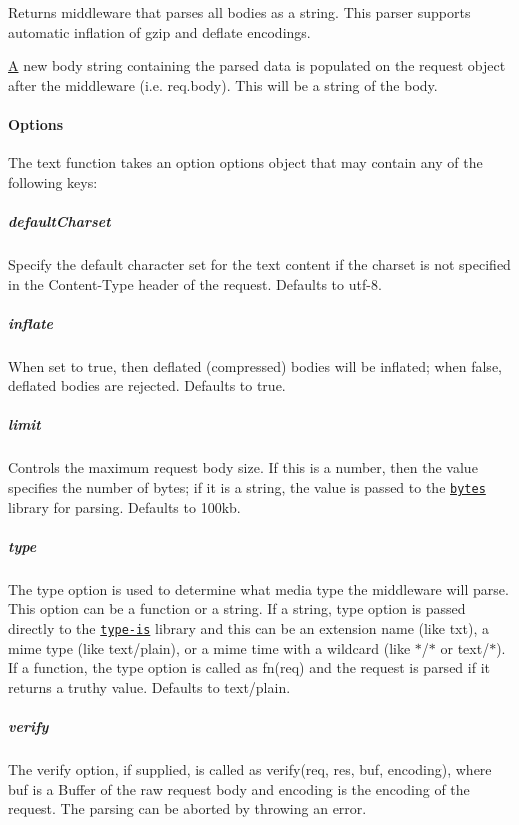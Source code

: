 Returns middleware that parses all bodies as a string. This parser supports automatic inflation of {\ttfamily gzip} and {\ttfamily deflate} encodings.

\hyperlink{class_a}{A} new {\ttfamily body} string containing the parsed data is populated on the {\ttfamily request} object after the middleware (i.\+e. {\ttfamily req.\+body}). This will be a string of the body.

\paragraph*{Options}

The {\ttfamily text} function takes an option {\ttfamily options} object that may contain any of the following keys\+:

\subparagraph*{default\+Charset}

Specify the default character set for the text content if the charset is not specified in the {\ttfamily Content-\/\+Type} header of the request. Defaults to {\ttfamily utf-\/8}.

\subparagraph*{inflate}

When set to {\ttfamily true}, then deflated (compressed) bodies will be inflated; when {\ttfamily false}, deflated bodies are rejected. Defaults to {\ttfamily true}.

\subparagraph*{limit}

Controls the maximum request body size. If this is a number, then the value specifies the number of bytes; if it is a string, the value is passed to the \href{https://www.npmjs.com/package/bytes}{\tt bytes} library for parsing. Defaults to {\ttfamily \textquotesingle{}100kb\textquotesingle{}}.

\subparagraph*{type}

The {\ttfamily type} option is used to determine what media type the middleware will parse. This option can be a function or a string. If a string, {\ttfamily type} option is passed directly to the \href{https://www.npmjs.org/package/type-is#readme}{\tt type-\/is} library and this can be an extension name (like {\ttfamily txt}), a mime type (like {\ttfamily text/plain}), or a mime time with a wildcard (like {\ttfamily $\ast$/$\ast$} or {\ttfamily text/$\ast$}). If a function, the {\ttfamily type} option is called as {\ttfamily fn(req)} and the request is parsed if it returns a truthy value. Defaults to {\ttfamily text/plain}.

\subparagraph*{verify}

The {\ttfamily verify} option, if supplied, is called as {\ttfamily verify(req, res, buf, encoding)}, where {\ttfamily buf} is a {\ttfamily Buffer} of the raw request body and {\ttfamily encoding} is the encoding of the request. The parsing can be aborted by throwing an error.

